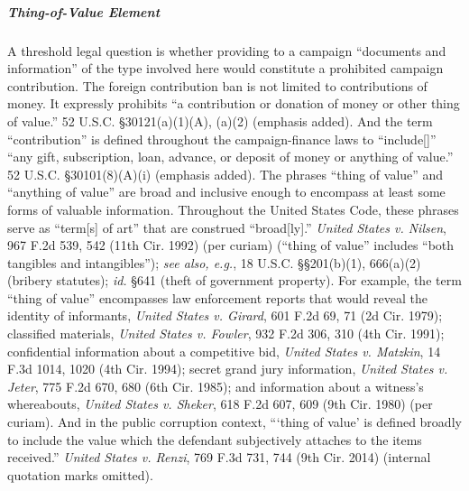 \subparagraph{Thing-of-Value Element}
A threshold legal question is whether providing to a campaign ``documents and information'' of the type involved here would constitute a prohibited campaign contribution.
The foreign contribution ban is not limited to contributions of money.
It expressly prohibits ``a contribution or donation of money or other thing of value.''
52 U.S.C. \S 30121(a)(1)(A), (a)(2) (emphasis added).
And the term ``contribution'' is defined throughout the campaign-finance laws to ``include[]'' ``any gift, subscription, loan, advance, or deposit of money or anything of value.''
52 U.S.C. \S 30101(8)(A)(i) (emphasis added).
The phrases ``thing of value'' and ``anything of value'' are broad and inclusive enough to encompass at least some forms of valuable information.
Throughout the United States Code, these phrases serve as ``term[s] of art'' that are construed ``broad[ly].''
\textit{United States v. Nilsen}, 967 F.2d 539, 542 (11th Cir. 1992) (per curiam) (``thing of value'' includes ``both tangibles and intangibles''); \textit{see also, e.g.}, 18 U.S.C. \S\S 201(b)(1), 666(a)(2) (bribery statutes); \textit{id.} \S 641 (theft of government property).
For example, the term ``thing of value'' encompasses law enforcement reports that would reveal the identity of informants, \textit{United States v. Girard}, 601 F.2d 69, 71 (2d Cir. 1979); classified materials, \textit{United States v. Fowler}, 932 F.2d 306, 310 (4th Cir. 1991); confidential information about a competitive bid, \textit{United States v. Matzkin}, 14 F.3d 1014, 1020 (4th Cir. 1994); secret grand jury information, \textit{United States v. Jeter}, 775 F.2d 670, 680 (6th Cir. 1985); and information about a witness's whereabouts, \textit{United States v. Sheker}, 618 F.2d 607, 609 (9th Cir. 1980) (per curiam).
And in the public corruption context, ```thing of value' is defined broadly to include the value which the defendant subjectively attaches to the items received.''
\textit{United States v. Renzi}, 769 F.3d 731, 744 (9th Cir. 2014) (internal quotation marks omitted).

